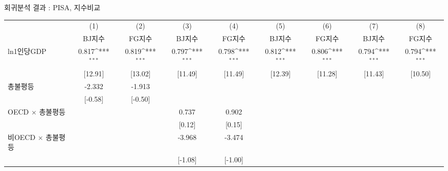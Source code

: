 \centering
\def\sym#1{\ifmmode^{#1}\else\(^{#1}\)\fi}
\caption{회귀분석 결과 : PISA, 지수비교 \label{tab:pisa_rob1}}
\begin{tabular}{l*{8}{c}}
\toprule
                    &\multicolumn{1}{c}{(1)}&\multicolumn{1}{c}{(2)}&\multicolumn{1}{c}{(3)}&\multicolumn{1}{c}{(4)}&\multicolumn{1}{c}{(5)}&\multicolumn{1}{c}{(6)}&\multicolumn{1}{c}{(7)}&\multicolumn{1}{c}{(8)}\\
                    &\multicolumn{1}{c}{BJ지수}&\multicolumn{1}{c}{FG지수}&\multicolumn{1}{c}{BJ지수}&\multicolumn{1}{c}{FG지수}&\multicolumn{1}{c}{BJ지수}&\multicolumn{1}{c}{FG지수}&\multicolumn{1}{c}{BJ지수}&\multicolumn{1}{c}{FG지수}\\
\midrule
ln1인당GDP        &       0.817\sym{***}&       0.819\sym{***}&       0.797\sym{***}&       0.798\sym{***}&       0.812\sym{***}&       0.806\sym{***}&       0.794\sym{***}&       0.794\sym{***}\\
                    &     [12.91]         &     [13.02]         &     [11.49]         &     [11.49]         &     [12.39]         &     [11.28]         &     [11.43]         &     [10.50]         \\
\addlinespace
총불평등          &      -2.332         &       -1.913        &                     &                     &                     &                     &                     &                     \\
                    &     [-0.58]         &      [-0.50]        &                     &                     &                     &                     &                     &                     \\
\addlinespace
OECD $\times$ 총불평등&                     &                     &       0.737      &       0.902         &                     &                     &                     &                     \\
                    &                     &                     &      [0.12]         &      [0.15]         &                     &                     &                     &                     \\
\addlinespace
비OECD $\times$ 총불평등&                     &                     &      -3.968         &      -3.474         &                     &                     &                     &                     \\
                    &                     &                     &     [-1.08]         &     [-1.00]         &                     &                     &                     &                     \\

\end{tabular}
